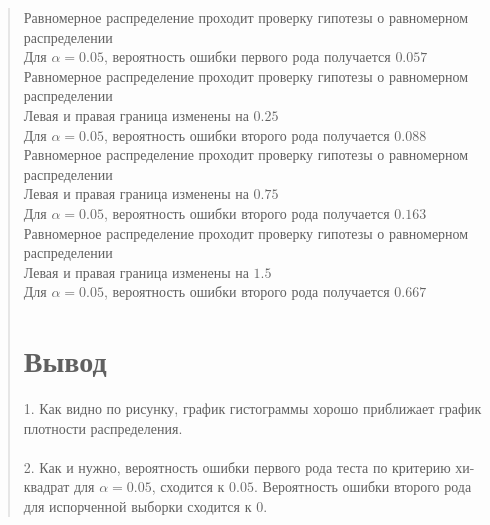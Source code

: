 \documentclass{article}
\begin{document}
\begin{quote}
	Равномерное распределение проходит проверку гипотезы о равномерном распределении \\
	Для $\alpha = 0.05$, вероятность ошибки первого рода получается $0.057$ \\

	Равномерное распределение проходит проверку гипотезы о равномерном распределении \\ 
	Левая и правая граница изменены на $0.25$ \\
	Для $\alpha = 0.05$, вероятность ошибки второго рода получается $0.088$ \\

	Равномерное распределение проходит проверку гипотезы о равномерном распределении \\
	Левая и правая граница изменены на $0.75$ \\
	Для $\alpha = 0.05$, вероятность ошибки второго рода получается $0.163$ \\

	Равномерное распределение проходит проверку гипотезы о равномерном распределении \\
	Левая и правая граница изменены на $1.5$ \\
	Для $\alpha = 0.05$, вероятность ошибки второго рода получается $0.667$ \\

\section{Вывод}
	1. Как видно по рисунку, график гистограммы хорошо приближает график плотности распределения. \\ \\
        2. Как и нужно, вероятность ошибки первого рода теста по критерию хи-квадрат для $\alpha = 0.05$, сходится к $0.05$. Вероятность ошибки второго рода для испорченной выборки сходится к $0$.


\end{quote}
\end{document}
